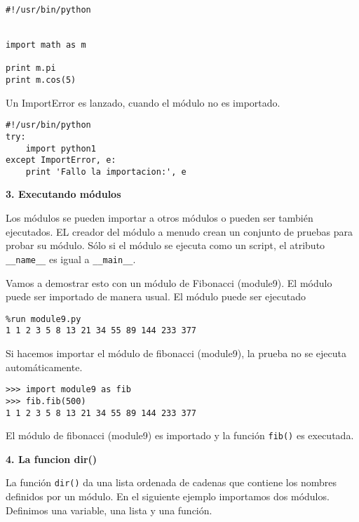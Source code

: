 \documentclass[twoside,10.5pt]{article}%
\begin{document}
\begin{verbatim}
#!/usr/bin/python


import math as m

print m.pi
print m.cos(5)
\end{verbatim}

\vspace{0.3cm}

Un {\color{red}ImportError} es lanzado, cuando el m\'odulo no es importado.


\begin{verbatim}
#!/usr/bin/python
try:
    import python1
except ImportError, e:
    print 'Fallo la importacion:', e
\end{verbatim}

\vspace{0.3cm}

\textbf{3. Executando m\'odulos}

Los m\'odulos se pueden importar a otros m\'odulos o pueden ser tambi\'en ejecutados. EL creador  del m\'odulo a menudo crean un conjunto de pruebas para probar su m\'odulo. S\'olo si el m\'odulo se ejecuta como un script, el atributo \texttt{\_\_name\_\_} es igual a \texttt{\_\_main\_\_}. 

Vamos a demostrar esto con un m\'odulo de Fibonacci (module9). El m\'odulo puede ser importado de manera usual. El m\'odulo puede ser ejecutado 


\begin{verbatim}
%run module9.py
1 1 2 3 5 8 13 21 34 55 89 144 233 377
\end{verbatim}

Si  hacemos importar el m\'odulo de fibonacci (module9), la prueba no se ejecuta autom\'aticamente.

 
\begin{verbatim}
>>> import module9 as fib
>>> fib.fib(500)
1 1 2 3 5 8 13 21 34 55 89 144 233 377
\end{verbatim}

El m\'odulo de fibonacci (module9) es importado y la funci\'on \texttt{fib()} es executada.

\vspace{0.3cm}

\textbf{4. La funcion dir()}

La funci\'on \texttt{dir()} da una lista ordenada de cadenas que contiene los nombres definidos por un m\'odulo. En el siguiente ejemplo importamos dos m\'odulos. Definimos una variable, una lista y una funci\'on.
\end{document}
